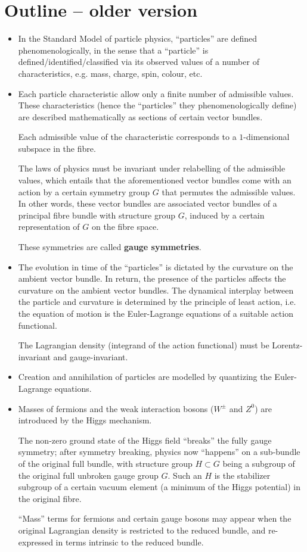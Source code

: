 \section{Outline -- older version}
\begin{itemize}
\item
	In the Standard Model of particle physics, ``particles'' are defined
	phenomenologically, in the sense that a ``particle'' is defined/identified/classified
	via its observed values of a number of characteristics,
	e.g. mass, charge, spin, colour, etc.
\item
	Each particle characteristic allow only a finite number of admissible values.
	These characteristics (hence the ``particles'' they phenomenologically define)
	are described mathematically as sections of certain vector bundles.
	
	Each admissible value of the characteristic corresponds
	to a $1$-dimensional subspace in the fibre.
	
	The laws of physics must be invariant under relabelling of the admissible values,
	which entails that the aforementioned vector bundles come with an action by a certain
	symmetry group $G$ that permutes the admissible values.
	In other words, these vector bundles are associated vector bundles of a
	principal fibre bundle with structure group $G$, induced by a certain representation
	of $G$ on the fibre space.
	
	These symmetries are called \textbf{gauge symmetries}.
\item
	The evolution in time of the ``particles'' is dictated by the curvature on the ambient vector bundle.
	In return, the presence of the particles affects the curvature on the ambient vector bundles.
	The dynamical interplay between the particle and curvature is determined by the principle
	of least action, i.e. the equation of motion is the Euler-Lagrange equations of a suitable
	action functional.
	
	The Lagrangian density (integrand of the action functional) must be
	Lorentz-invariant and gauge-invariant.
\item
	Creation and annihilation of particles are modelled by quantizing
	the Euler-Lagrange equations. 
\item
	Masses of fermions and the weak interaction bosons ($W^{\pm}$ and $Z^{0}$)
	are introduced by the Higgs mechanism.
	
	The non-zero ground state of the Higgs field ``breaks'' the fully gauge symmetry;
	after symmetry breaking, physics now ``happens'' on a sub-bundle of the original full bundle,
	with structure group $H \subset G$ being a subgroup of the original full unbroken gauge group $G$.
	Such an $H$ is the stabilizer subgroup of a certain vacuum element (a minimum of the Higgs potential)
	in the original fibre.
	
	``Mass'' terms for fermions and certain gauge bosons may appear
	when the original Lagrangian density is restricted to the reduced bundle,
	and re-expressed in terms intrinsic to the reduced bundle.
\end{itemize}


